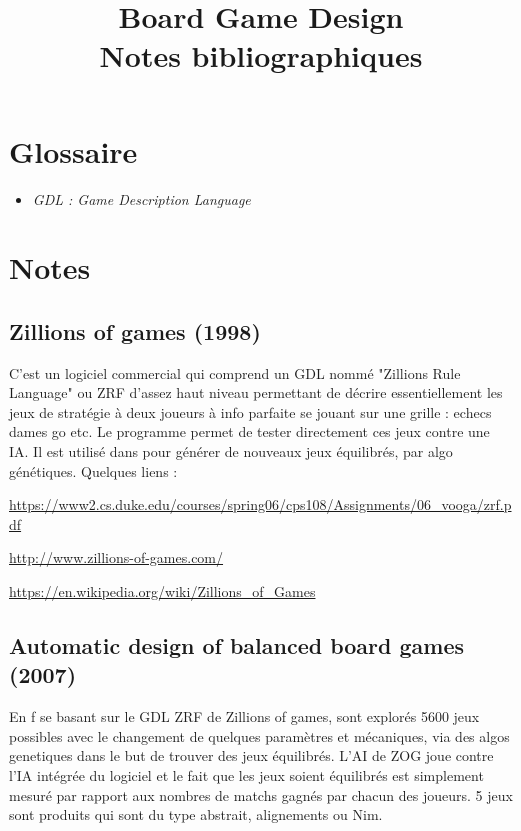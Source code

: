 \documentclass[a4paper,11pt]{article}
\title{Board Game Design\\
Notes bibliographiques}
\author{}
\begin{document}
\maketitle 

\tableofcontents

\section{Glossaire}

\begin{itemize}
\item \emph{GDL : Game Description Language}
\end{itemize}

\section{Notes}

\subsection{Zillions of games (1998)} 
C'est un logiciel commercial
qui comprend un GDL nommé "Zillions Rule Language" ou ZRF \cite{lefler2004zillions}  d'assez haut niveau permettant de décrire essentiellement les jeux de stratégie à deux joueurs à info parfaite se jouant sur une grille : echecs dames go etc. Le programme permet de tester directement ces jeux contre une IA.
Il est utilisé dans \cite{hom2007automatic} pour générer de nouveaux jeux équilibrés, par algo génétiques. Quelques liens :

\url{https://www2.cs.duke.edu/courses/spring06/cps108/Assignments/06_vooga/zrf.pdf}

\url{http://www.zillions-of-games.com/}

\url{https://en.wikipedia.org/wiki/Zillions_of_Games}



\subsection{Automatic design of balanced board games (2007) \cite{hom2007automatic}}

En f se basant sur le GDL ZRF de Zillions of games, sont explorés 5600 jeux possibles avec le changement de quelques paramètres et mécaniques, via des algos genetiques dans le but de trouver des jeux équilibrés. L'AI de ZOG joue contre l'IA intégrée du logiciel et le fait que les jeux soient équilibrés est simplement mesuré par rapport aux nombres de matchs gagnés par chacun des joueurs. 5 jeux sont produits qui sont du type abstrait, alignements ou Nim.
\end{document}
